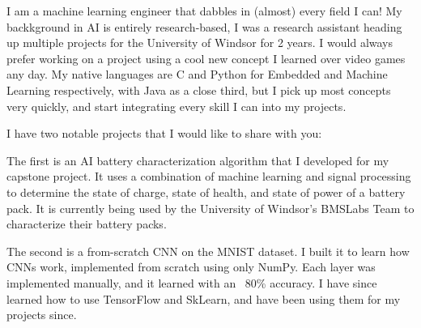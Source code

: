 I am a machine learning engineer that dabbles in (almost) every field I can! My backkground in AI is entirely research-based, I was a research assistant heading up multiple projects for the University of Windsor for 2 years. I would always prefer working on a project using a cool new concept I learned over video games any day. My native languages are C and Python for Embedded and Machine Learning respectively, with Java as a close third, but I pick up most concepts very quickly, and start integrating every skill I can into my projects.

I have two notable projects that I would like to share with you:

The first is an AI battery characterization algorithm that I developed for my capstone project. It uses a combination of machine learning and signal processing to determine the state of charge, state of health, and state of power of a battery pack. It is currently being used by the University of Windsor's BMSLabs Team to characterize their battery packs.

The second is a from-scratch CNN on the MNIST dataset. I built it to learn how CNNs work, implemented from scratch using only NumPy. Each layer was implemented manually, and it learned with an ~80\% accuracy. I have since learned how to use TensorFlow and SkLearn, and have been using them for my projects since.